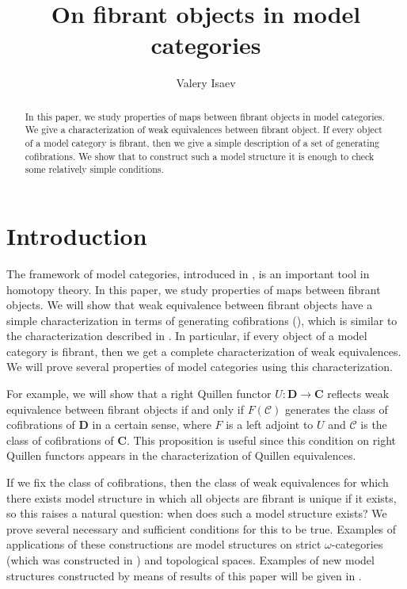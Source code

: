 \documentclass{tac}
\author{Valery Isaev}
\title{On fibrant objects in model categories}
\theoremstyle{definition}
\newcommand{\cof}{\mathcal{C}}
\newcommand{\cat}[1]{\mathbf{#1}}
\newcommand{\C}{\cat{C}}
\newcommand{\D}{\cat{D}}
\begin{document}
\maketitle

\begin{abstract}
In this paper, we study properties of maps between fibrant objects in model categories.
We give a characterization of weak equivalences between fibrant object.
If every object of a model category is fibrant, then we give a simple description of a set of generating cofibrations.
We show that to construct such a model structure it is enough to check some relatively simple conditions.
\end{abstract}

\section{Introduction}

The framework of model categories, introduced in \cite{quillen}, is an important tool in homotopy theory.
In this paper, we study properties of maps between fibrant objects.
We will show that weak equivalence between fibrant objects have a simple characterization in terms of generating cofibrations (),
which is similar to the characterization described in \cite{vogt-we}.
In particular, if every object of a model category is fibrant, then we get a complete characterization of weak equivalences.
We will prove several properties of model categories using this characterization.

For example, we will show that a right Quillen functor $U : \D \to \C$ reflects weak equivalence between fibrant objects if and only if
$F(\cof)$ generates the class of cofibrations of $\D$ in a certain sense, where $F$ is a left adjoint to $U$ and $\cof$ is the class of cofibrations of $\C$.
This proposition is useful since this condition on right Quillen functors appears in the characterization of Quillen equivalences. 

If we fix the class of cofibrations, then the class of weak equivalences for which there exists model structure in which all objects are fibrant is unique if it exists,
so this raises a natural question: when does such a model structure exists?
We prove several necessary and sufficient conditions for this to be true.
Examples of applications of these constructions are model structures on strict $\omega$-categories (which was constructed in \cite{folk}) and topological spaces.
Examples of new model structures constructed by means of results of this paper will be given in \cite{alg-models}.
\end{document}
